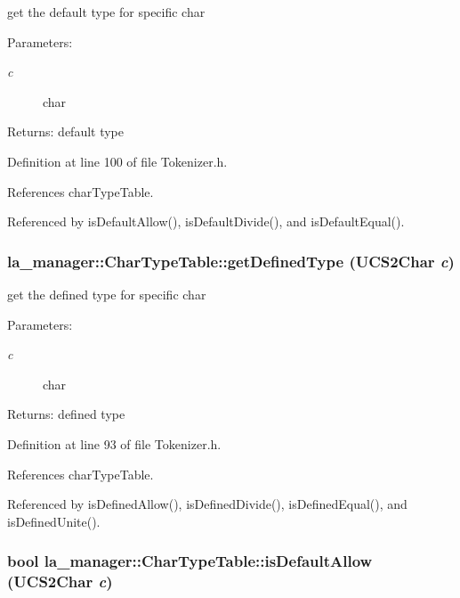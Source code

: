 get the default type for specific char 

\begin{Desc}
\item[Parameters:]
\begin{description}
\item[{\em c}]char \end{description}
\end{Desc}
\begin{Desc}
\item[Returns:]default type \end{Desc}


Definition at line 100 of file Tokenizer.h.

References charTypeTable.

Referenced by isDefaultAllow(), isDefaultDivide(), and isDefaultEqual().\hypertarget{classla__manager_1_1CharTypeTable_5b4079ad0b89f6c84053ee955e3bc312}{
\subsubsection[{getDefinedType}]{ la\_\-manager::CharTypeTable::getDefinedType (UCS2Char {\em c})}}
\label{classla__manager_1_1CharTypeTable_5b4079ad0b89f6c84053ee955e3bc312}


get the defined type for specific char 

\begin{Desc}
\item[Parameters:]
\begin{description}
\item[{\em c}]char \end{description}
\end{Desc}
\begin{Desc}
\item[Returns:]defined type \end{Desc}


Definition at line 93 of file Tokenizer.h.

References charTypeTable.

Referenced by isDefinedAllow(), isDefinedDivide(), isDefinedEqual(), and isDefinedUnite().\hypertarget{classla__manager_1_1CharTypeTable_872ee1be76a6008bf86b2255b16d3679}{
\subsubsection[{isDefaultAllow}]{\setlength{\rightskip}{0pt plus 5cm}bool la\_\-manager::CharTypeTable::isDefaultAllow (UCS2Char {\em c})}}
\label{classla__manager_1_1CharTypeTable_872ee1be76a6008bf86b2255b16d3679}


